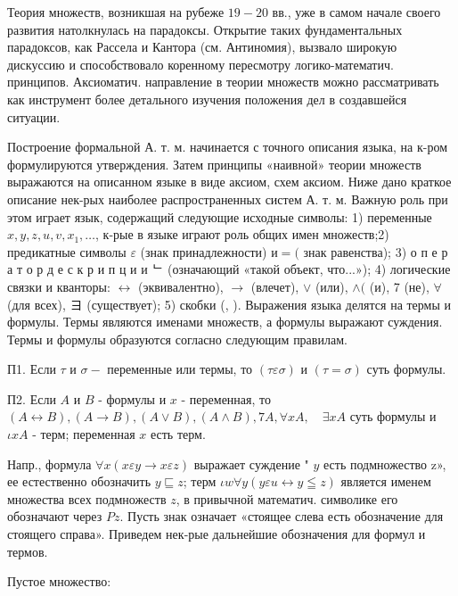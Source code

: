 \documentclass[10pt]{article}
\begin{document}
Теория множеств, возникшая на рубеже $19-20$ вв., уже в самом начале своего развития натолкнулась на парадоксы. Открытие таких фундаментальных парадоксов, как Рассела и Кантора (см. Антиномия), вызвало широкую дискуссию и способствовало коренному пересмотру логико-математич. принципов. Аксиоматич. направление в теории множеств можно рассматривать как инструмент более детального изучения положения дел в создавшейся ситуации.



Построение формальной А. т. м. начинается с точного описания языка, на к-ром формулируются утверждения. Затем принципы «наивной» теории множеств выражаются на описанном языке в виде аксиом, схем аксиом. Ниже дано краткое описание нек-рых наиболее распространенных систем А. т. м. Важную роль при этом играет язык, содержащий следующие исходные символы: 1) переменные $x, y, z, u, v, x_{1}, \ldots$, к-рые в языке играют роль общих имен множеств;2) предикатные символы $\varepsilon$ (знак принадлежности) $и=($ знак равенства); 3) о п е р а т о р д е с к р и п ц и и ᄂ (означающий «такой объект, что...»); 4) логические связки и кванторы: $\leftrightarrow$ (эквивалентно), $\rightarrow$ (влечет), $\vee$ (или), $\wedge($ (и), 7 (не), $\forall$ (для всех), ヨ (существует); 5) скобки (, ). Выражения языка делятся на термы и формулы. Термы являются именами множеств, а формулы выражают суждения. Термы и формулы образуются согласно следующим правилам.



П1. Если $\tau$ и $\sigma-$ переменные или термы, то $(\tau \varepsilon \sigma)$ и $(\tau=\sigma)$ суть формулы.



П2. Если $A$ и $B$ - формулы и $x$ - переменная, то $(A \leftrightarrow B),(A \rightarrow B),(A \vee B),(A \wedge B), 7 A, \forall x A, \quad \exists x A$ суть формулы и $\iota x A$ - терм; переменная $x$ есть терм.



Напр., формула $\forall x(x \varepsilon y \rightarrow x \varepsilon z)$ выражает суждение " $y$ есть подмножество z», ее естественно обозначить $y \sqsubseteq z$; терм $\iota w \forall y(y \varepsilon u \leftrightarrow y \leqq z)$ является именем множества всех подмножеств $z$, в привычной математич. символике его обозначают через $P z$. Пусть знак означает «стоящее слева есть обозначение для стоящего справа». Приведем нек-рые дальнейшие обозначения для формул и термов.



Пустое множество:
\end{document}
